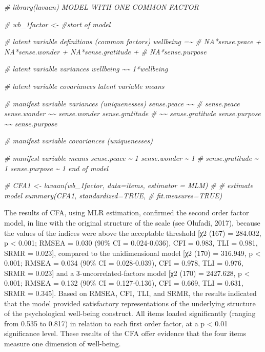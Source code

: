 \documentclass[
]{report}
\newenvironment{Shaded}{\begin{snugshade}}{\end{snugshade}}
\newcommand{\CommentTok}[1]{\textcolor[rgb]{0.56,0.35,0.01}{\textit{#1}}}
\begin{document}
\begin{Shaded}
\begin{Highlighting}[]
\CommentTok{\# library(lavaan) MODEL WITH ONE COMMON FACTOR}

\CommentTok{\# wb\_1factor \textless{}{-} \textquotesingle{} \#start of model}

\CommentTok{\# latent variable definitions (common factors) wellbeing =\textasciitilde{}}
\CommentTok{\# NA*sense.peace + NA*sense.wonder + NA*sense.gratitude +}
\CommentTok{\# NA*sense.purpose}

\CommentTok{\# latent variable variances wellbeing \textasciitilde{}\textasciitilde{} 1*wellbeing}

\CommentTok{\# latent variable covariances latent variable means}

\CommentTok{\# manifest variable variances (uniquenesses) sense.peace \textasciitilde{}\textasciitilde{}}
\CommentTok{\# sense.peace sense.wonder \textasciitilde{}\textasciitilde{} sense.wonder sense.gratitude}
\CommentTok{\# \textasciitilde{}\textasciitilde{} sense.gratitude sense.purpose \textasciitilde{}\textasciitilde{} sense.purpose}

\CommentTok{\# manifest variable covariances (uniquenesses)}

\CommentTok{\# manifest variable means sense.peace \textasciitilde{} 1 sense.wonder \textasciitilde{} 1}
\CommentTok{\# sense.gratitude \textasciitilde{} 1 sense.purpose \textasciitilde{} 1 end of model}

\CommentTok{\# CFA1 \textless{}{-} lavaan(wb\_1factor, data=items, estimator = \textquotesingle{}MLM\textquotesingle{})}
\CommentTok{\# \# estimate model summary(CFA1, standardized=TRUE,}
\CommentTok{\# fit.measures=TRUE)}
\end{Highlighting}
\end{Shaded}

The results of CFA, using MLR estimation, confirmed the second order factor model, in line with the original structure of the scale (see Olufadi, 2017), because the values of the indices were above the acceptable threshold {[}χ2 (167) = 284.032, p \textless{} 0.001; RMSEA = 0.030 (90\% CI = 0.024-0.036), CFI = 0.983, TLI = 0.981, SRMR = 0.023{]}, compared to the unidimensional model {[}χ2 (170) = 316.949, p \textless{} 0.001; RMSEA = 0.034 (90\% CI = 0.028-0.039), CFI = 0.978, TLI = 0.976, SRMR = 0.023{]} and a 3-uncorrelated-factors model {[}χ2 (170) = 2427.628, p \textless{} 0.001; RMSEA = 0.132 (90\% CI = 0.127-0.136), CFI = 0.669, TLI = 0.631, SRMR = 0.345{]}. Based on RMSEA, CFI, TLI, and SRMR, the results indicated that the model provided satisfactory representations of the underlying structure of the psychological well-being construct. All items loaded significantly (ranging from 0.535 to 0.817) in relation to each first order factor, at a p \textless{} 0.01 significance level. These results of the CFA offer evidence that the four items measure one dimension of well-being.
\end{document}
